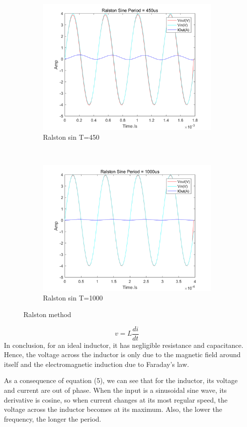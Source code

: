 \documentclass[a4paper, 12pt]{article}
\begin{document}
\begin{figure}[h]
\begin{subfigure}[b]{0.4\textwidth}
            \includegraphics[width=\textwidth]{ex1/ralston_t_equal_to_450.png}
            \caption{Ralston sin T=450}
      \end{subfigure}
       ~
      \begin{subfigure}[b]{0.4\textwidth}
            \includegraphics[width=\textwidth]{ex1/ralston_t_equal_to_1000.png}
            \caption{Ralston sin T=1000}
      \end{subfigure}
      \caption{Ralston method}
\end{figure}


\begin{equation}\label{inductor}
v=L\frac{di}{dt}
\end{equation} 
In conclusion, for an ideal inductor, it has negligible resistance and capacitance. Hence, the voltage across the inductor is only due to the magnetic field around itself and the electromagnetic induction due to Faraday's law. \par
As a consequence of equation (5), we can see that for the inductor, its voltage and current are out of phase. When the input is a sinusoidal sine wave, its derivative is cosine, so when current changes at its most regular speed, the voltage across the inductor becomes at its maximum. Also, the lower the frequency, the longer the period. 
\end{document}
